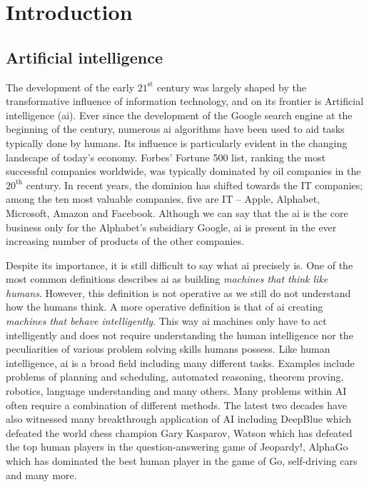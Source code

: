 \chapter{Introduction}\label{ch:introduction}


\section{Artificial intelligence}


The development of the early $21^{\text{st}}$ century was largely shaped by the transformative influence of information technology, and on its frontier is  Artificial intelligence (\gls{ai}).
Ever since the development of the Google search engine at the beginning of the century, numerous \gls{ai} algorithms have been used to aid tasks typically done by humans.
Its influence is particularly evident in the changing landscape of today's economy.
Forbes' Fortune 500 list, ranking the most successful companies worldwide, was typically dominated by oil companies in the $20^{\text{th}}$ century.
In recent years, the dominion has shifted towards the IT companies; among the ten most valuable companies, five are IT -- Apple, Alphabet, Microsoft, Amazon and Facebook.
Although we can say that the \gls{ai} is the core business only for the Alphabet's subsidiary Google, \gls{ai} is present in the ever increasing number of products of the other companies.







Despite its importance, it is still difficult to say what \gls{ai} precisely is.
One of the most common definitions describes \gls{ai} as building \textit{machines that think like humans}.
However, this definition is not operative as we still do not understand how the humans think.
A more operative definition is that of \gls{ai} creating \textit{machines that behave intelligently}.
This  way \gls{ai} machines only have to act intelligently and does not require understanding the human intelligence nor the peculiarities of various problem solving skills humans possess.
Like human intelligence, \gls{ai} is a broad field including many different tasks.
Examples include problems of planning and scheduling, automated reasoning, theorem proving, robotics, language understanding and many others.
Many problems within AI often require a combination of different methods.
The latest two decades have also witnessed many breakthrough application of AI including DeepBlue \cite{Hsu:2002:BDB:601291}  which defeated the world chess champion Gary Kasparov, Watson \cite{journals/aim/FerrucciBCFGKLMNPSW10} which has defeated the top human players in the question-answering game of Jeopardy!, AlphaGo \cite{SilverHuangEtAl16nature,silver2017mastering} which has dominated the best human player in the game of Go, self-driving cars and many more.





